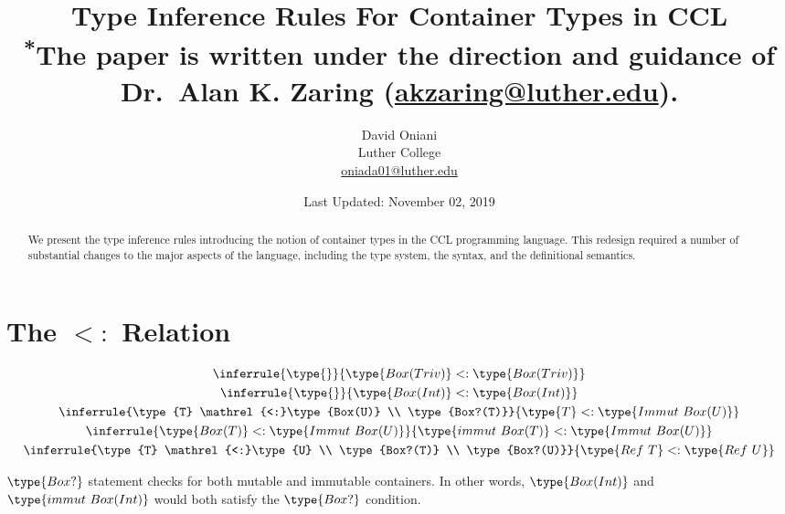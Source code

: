 \documentclass{article}
\author{David Oniani\\
        Luther College\\
        \href{mailto:oniada01@luther.edu}{oniada01@luther.edu}}
\title{\textbf{Type Inference Rules For Container Types in CCL}\\
       \medskip
       \small \textsuperscript{*}The paper is written under the direction and
       guidance of Dr.\ Alan K. Zaring
       (\href{mailto:akzaring@luther.edu}{akzaring@luther.edu}).}
\date{Last Updated: November 02, 2019}
\newcommand\subtype{\mathrel{<:}}
\begin{document}
\maketitle


\begin{abstract}
\noindent We present the type inference rules introducing the notion of
container types in the CCL programming language. This redesign required a
number of substantial changes to the major aspects of the language, including
the type system, the syntax, and the definitional semantics.
\end{abstract}


\section*{The $\subtype$ Relation}

\begin{gather}
  \inferrule{\type{}}{\type{Box(Triv)} \subtype \type{Box(Triv)}}\\
  \inferrule{\type{}}{\type{Box(Int)} \subtype \type{Box(Int)}}\\
  \inferrule{\type{T} \subtype \type{Box(U)} \\ \type{Box?(T)}}{\type{T} \subtype \type{Immut\ Box(U)}}\\
  \inferrule{\type{Box(T)} \subtype \type{Immut\ Box(U)}}{\type{immut\ Box(T)} \subtype \type{Immut\ Box(U)}}\\
  \inferrule{\type{T} \subtype \type{U} \\ \type{Box?(T)} \\ \type{Box?(U)}}{\type{Ref\ T} \subtype \type{Ref\ U}}
\end{gather}

$\type{Box?}$ statement checks for both mutable and immutable containers.
In other words, $\type{Box(Int)}$ and $\type{immut\ Box(Int)}$ would both
satisfy the $\type{Box?}$ condition.

\end{document}
